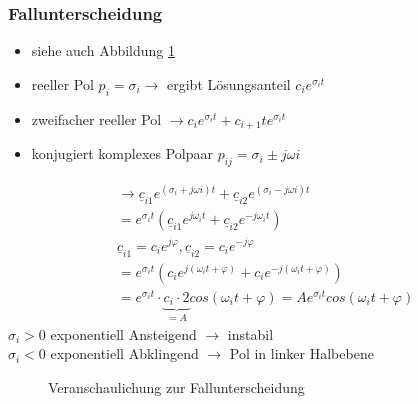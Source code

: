 \subsubsection{Fallunterscheidung}
\begin{itemize}
  \item siehe auch Abbildung \ref{fig:elNetzw:Fallunterscheidung}
  \item reeller Pol $p_i=\sigma_i \rightarrow$ ergibt Lösungsanteil
  $c_ie^{\sigma_it}$
  \item zweifacher reeller Pol $\rightarrow
  c_ie^{\sigma_it}+c_{i+1}te^{\sigma_it}$
  \item konjugiert komplexes Polpaar $p_{ij}=\sigma_i\pm j\omega i$
\end{itemize}
\begin{align}
  &\rightarrow \underline{c}_{i1}e^{(\sigma_i+j\omega
  i)t}+\underline{c}_{i2}e^{(\sigma_i-j\omega i)t}\nonumber\\
  &=e^{\sigma_it}\left(\underline{c}_{i1}e^{j\omega_it}+\underline{c}_{i2}e^{-j\omega_it}\right)\nonumber\\
  &\underline{c}_{i1}=c_ie^{j\varphi},
  \underline{c}_{i2}=c_ie^{-j\varphi}\nonumber\\
  &=e^{\sigma_it}\left(c_ie^{j\left(\omega_it+\varphi\right)}+c_ie^{-j\left(\omega_it+\varphi\right)}\right)\nonumber\\
  &=e^{\sigma_it}\cdot
  \underbrace{c_i\cdot2}_{=A}cos(\omega_it+\varphi)=Ae^{\sigma_it}cos(\omega_it+\varphi)\nonumber
\end{align}
$\sigma_i > 0$ exponentiell Ansteigend $\rightarrow$ instabil\\
$\sigma_i < 0$ exponentiell Abklingend $\rightarrow$ Pol in linker Halbebene\\

\begin{figure}[!ht]
\begin{center}
  
  \caption{Veranschaulichung zur Fallunterscheidung}
  \label{fig:elNetzw:Fallunterscheidung}
\end{center}
\end{figure}

